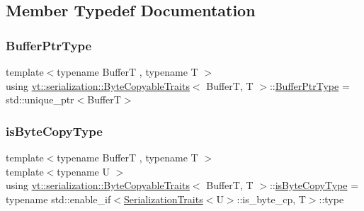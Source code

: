\subsection{Member Typedef Documentation}
\mbox{\label{structvt_1_1serialization_1_1_byte_copyable_traits_ab06bcaa790f4a227936f6d6854d2bf41}} 
\subsubsection{\texorpdfstring{Buffer\+Ptr\+Type}{BufferPtrType}}
{\footnotesize\ttfamily template$<$typename BufferT , typename T $>$ \\
using \hyperlink{structvt_1_1serialization_1_1_byte_copyable_traits}{vt\+::serialization\+::\+Byte\+Copyable\+Traits}$<$ BufferT, T $>$\+::\hyperlink{structvt_1_1serialization_1_1_byte_copyable_traits_ab06bcaa790f4a227936f6d6854d2bf41}{Buffer\+Ptr\+Type} =  std\+::unique\+\_\+ptr$<$BufferT$>$}

\mbox{\label{structvt_1_1serialization_1_1_byte_copyable_traits_a3113636143fcf9ee209752353f9fec3a}} 
\subsubsection{\texorpdfstring{is\+Byte\+Copy\+Type}{isByteCopyType}}
{\footnotesize\ttfamily template$<$typename BufferT , typename T $>$ \\
template$<$typename U $>$ \\
using \hyperlink{structvt_1_1serialization_1_1_byte_copyable_traits}{vt\+::serialization\+::\+Byte\+Copyable\+Traits}$<$ BufferT, T $>$\+::\hyperlink{structvt_1_1serialization_1_1_byte_copyable_traits_a3113636143fcf9ee209752353f9fec3a}{is\+Byte\+Copy\+Type} =  typename std\+::enable\+\_\+if$<$\hyperlink{structvt_1_1serialization_1_1_serialization_traits}{Serialization\+Traits}$<$U$>$\+::is\+\_\+byte\+\_\+cp, T$>$\+::type}

